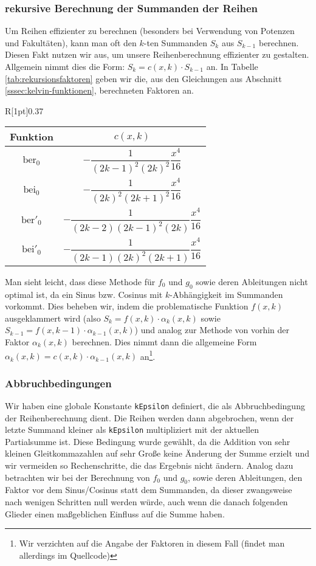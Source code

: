 \documentclass[10pt,a4paper]{article}
\begin{document}
\subsubsection{rekursive Berechnung der Summanden der Reihen}
Um Reihen effizienter zu berechnen (besonders bei Verwendung von Potenzen und Fakultäten), kann man oft den $k$-ten Summanden $S_k$ aus $S_{k-1}$ berechnen. Diesen Fakt nutzen wir aus, um unsere Reihenberechnung effizienter zu gestalten. Allgemein nimmt dies die Form: $S_k = c(x, k)\cdot S_{k-1}$ an.
In Tabelle \ref{tab:rekursionsfaktoren} geben wir die, aus den Gleichungen aus Abschnitt \ref{sssec:kelvin-funktionen}, berechneten Faktoren an.
\begin{wraptable}[16]{R}[1pt]{0.37\textwidth}
\begin{tabular}{c|c}
Funktion & $c(x,k)$ \\\hline
\rule[-3.5ex]{0pt}{8ex} $\mathrm{ber}_0$ & $-\dfrac{1}{(2k-1)^2 (2k)^2}\dfrac{x^4}{16}$ \\ \hline
\rule[-3.5ex]{0pt}{8ex} $\mathrm{bei}_0$ & $-\dfrac{1}{(2k)^2 (2k+1)^2}\dfrac{x^4}{16}$ \\ \hline
\rule[-3.5ex]{0pt}{8ex} $\mathrm{ber}'_0$ & $-\dfrac{1}{(2k-2) (2k-1)^2 (2k)}\dfrac{x^4}{16}$ \\ \hline
\rule[-3.5ex]{0pt}{8ex} $\mathrm{bei}'_0$ & $-\dfrac{1}{(2k-1) (2k)^2 (2k+1)}\dfrac{x^4}{16}$
\end{tabular}
\caption{Faktoren der Rekursionsformeln}
\label{tab:rekursionsfaktoren}
\end{wraptable}

Man sieht leicht, dass diese Methode für $f_0$ und $g_0$ sowie deren Ableitungen nicht optimal ist, da ein Sinus bzw. Cosinus mit $k$-Abhängigkeit im Summanden vorkommt.
Dies beheben wir, indem die problematische Funktion $f(x,k)$ ausgeklammert wird (also $S_k = f(x,k) \cdot \alpha_k(x,k)$ sowie $S_{k-1} = f(x,k-1) \cdot \alpha_{k-1}(x,k)$)
und analog zur Methode von vorhin der Faktor $\alpha_k(x,k)$ berechnen. Dies nimmt dann die allgemeine Form $\alpha_k(x,k) = c(x,k)\cdot\alpha_{k-1}(x,k)$ an\footnote{Wir verzichten auf die Angabe der Faktoren in diesem Fall (findet man allerdings im Quellcode)}.
\subsubsection{Abbruchbedingungen}
Wir haben eine globale Konstante \texttt{kEpsilon} definiert, die als Abbruchbedingung der Reihenberechnung dient.
Die Reihen werden dann abgebrochen, wenn der letzte Summand kleiner als \texttt{kEpsilon} multipliziert mit der aktuellen Partialsumme ist.
Diese Bedingung wurde gewählt, da die Addition von sehr kleinen Gleitkommazahlen auf sehr Große keine Änderung der Summe erzielt und wir vermeiden so Rechenschritte, die das Ergebnis nicht ändern.
Analog dazu betrachten wir bei der Berechnung von $f_0$ und $g_0$, sowie deren Ableitungen, den Faktor vor dem Sinus/Cosinus statt dem Summanden,
da dieser zwangsweise nach wenigen Schritten null werden würde, auch wenn die danach folgenden Glieder einen maßgeblichen Einfluss auf die Summe haben.
\end{document}
